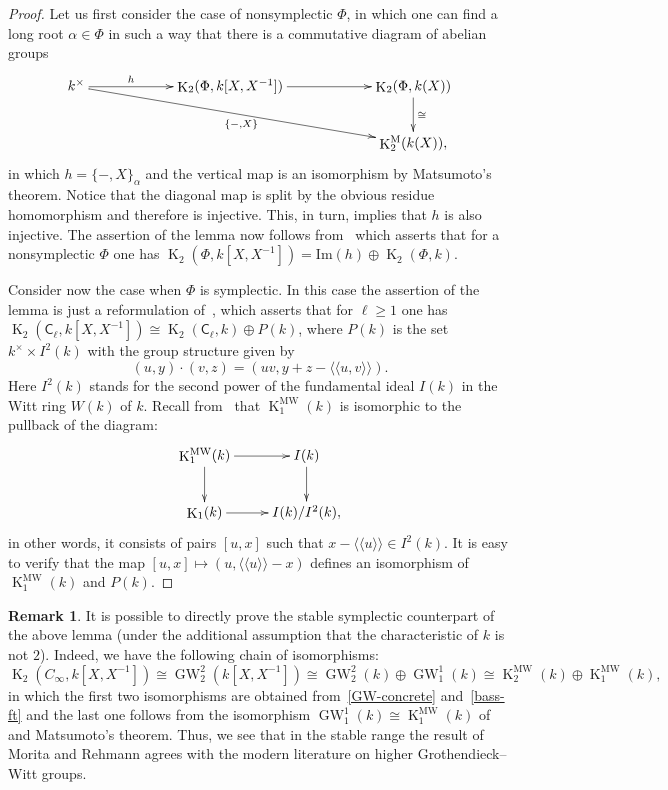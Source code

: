 \documentclass[oneside, 8pt]{amsart}
\theoremstyle{remark}
\theoremstyle{definition}
\numberwithin{lemma}{section}
\numberwithin{prop}{section}
\numberwithin{corollary}{section}
\numberwithin{externaltheorem}{section}
\newtheorem{rem}[lemma]{Remark}
\DeclareMathOperator{\K}{K}
\DeclareMathOperator{\GW}{GW}
\newcommand{\inv}{^{-1}}
\newcommand{\rC}{\mathsf{C}}
\numberwithin{equation}{section}
\begin{document}
\begin{proof} Let us first consider the case of nonsymplectic $\Phi$, in which one can find a long root $\alpha\in \Phi$ in such a way that there is a commutative diagram of abelian groups
\[\xymatrixcolsep{5pc}\xymatrix{k^\times \ar[r]^-{h} \ar[rrd]_{\{-, X\}} & \K_2(\Phi, k[X, X^{-1}]) \ar[r] & \K_2(\Phi, k(X)) \ar[d]^{\cong} \\
                                                                                      &                                 & \K_2^\mathrm{M}(k(X)),} \]
in which $h = \{ -, X \}_{\alpha}$ and the vertical map is an isomorphism by Matsumoto's theorem.
Notice that the diagonal map is split by the obvious residue homomorphism and therefore is injective. This, in turn, implies that $h$ is also injective.
The assertion of the lemma now follows from~\cite[Satz~3]{Hur77} which asserts that for a nonsymplectic $\Phi$ one has $\K_2(\Phi, k[X, X\inv]) = \mathrm{Im}(h) \oplus \K_2(\Phi, k)$.

Consider now the case when $\Phi$ is symplectic. In this case the assertion of the lemma is just a reformulation of~\cite[Theorem~B]{MR91},
which asserts that for $\ell \geq 1$ one has $\K_2(\rC_\ell, k[X, X\inv]) \cong \K_2(\rC_\ell, k) \oplus P(k)$, where
$P(k)$ is the set $k^\times \times I^2(k)$ with the group structure given by
\[ (u, y) \cdot (v, z) = (uv, y + z - \langle\langle u, v\rangle\rangle).\]
Here $I^2(k)$ stands for the second power of the fundamental ideal $I(k)$ in the Witt ring $W(k)$ of $k$.
Recall from~\cite{Mo04} that $\K_1^\mathrm{MW}(k)$ is isomorphic to the pullback of the diagram:
\[ \xymatrix{ \K_1^\mathrm{MW}(k) \ar[r] \ar[d] & I(k) \ar[d] \\ \K_1(k) \ar[r] & I(k)/I^2(k), } \]
in other words, it consists of pairs $[u, x]$ such that $x - \langle \langle u \rangle \rangle \in I^2(k)$.
It is easy to verify that the map $[u, x] \mapsto (u, \langle\langle u \rangle\rangle - x)$ defines an isomorphism of $\K_1^\mathrm{MW}(k)$ and $P(k)$. \end{proof}

\begin{rem} It is possible to directly prove the stable symplectic counterpart of the above lemma (under the additional assumption that the characteristic of $k$ is not $2$). Indeed, we have the following chain of isomorphisms:
\[ \K_2(C_\infty, k[X, X^{-1}]) \cong \GW_2^2(k[X,X^{-1}]) \cong \GW_2^2(k) \oplus \GW_1^1(k) \cong \K_2^\mathrm{MW}(k) \oplus \K_1^\mathrm{MW}(k),\]
in which the first two isomorphisms are obtained from~\eqref{GW-concrete} and~\cref{bass-ft} and the last one follows from the isomorphism $\GW_1^1(k) \cong \K_1^\mathrm{MW}(k)$ of~\cite[Lemma~4.1.1]{AF17} and Matsumoto's theorem. 
Thus, we see that in the stable range the result of Morita and Rehmann agrees with the modern literature on higher Grothendieck--Witt groups. \end{rem}
\end{document}
